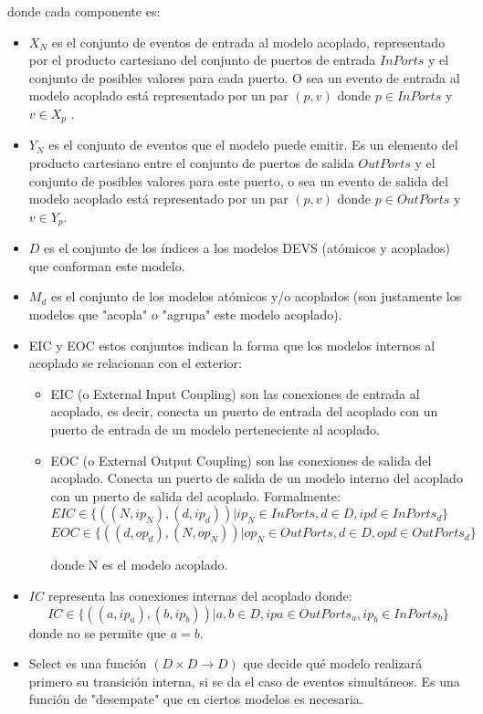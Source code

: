 \documentclass[a4paper,	11pt]{report}
\begin{document}
donde cada componente es:
\begin{itemize}
\item $X_N$ es el conjunto de eventos de entrada al modelo acoplado, representado por el producto cartesiano del conjunto de puertos de entrada $InPorts$ y el conjunto de posibles valores para cada puerto. O sea un evento de entrada al modelo acoplado está representado por un par $(p, v)$ donde $p \in InPorts$ y $v \in X_p$ .

\item $Y_N$ es el conjunto de eventos que el modelo puede emitir. Es un elemento del producto cartesiano entre el conjunto de puertos de salida $OutPorts$ y el conjunto de posibles valores para este puerto, o sea un evento de salida del modelo acoplado está representado por un par $(p, v)$ donde $p \in OutPorts$ y $v \in Y_p$.

\item $D$ es el conjunto de los índices a los modelos DEVS (atómicos y acoplados) que conforman este modelo. 

\item ${M_d }$ es el conjunto de los modelos atómicos y/o acoplados (son justamente los modelos que "acopla" o "agrupa" este modelo acoplado).

\item EIC y EOC estos conjuntos indican la forma que los modelos internos al acoplado se relacionan con el exterior:
      \begin {itemize}
          \item EIC (o External Input Coupling) son las conexiones de entrada al acoplado, es decir, conecta un puerto de entrada del acoplado con un puerto de entrada de un modelo perteneciente al acoplado.
          \item EOC (o External Output Coupling) son las conexiones de salida del acoplado. Conecta un puerto de salida de un modelo interno del acoplado con un puerto de salida del acoplado. Formalmente:
          $ EIC \in \{((N, ip_N ), (d, ip_d )) | ip_N \in InPorts, d \in D, ip d \in InPorts_d \} $
          $EOC \in \{((d, op_d ), (N, op_N ))  | op_N \in OutPorts, d \in D, op d \in OutPorts_d \} $
    
    	donde N es el modelo acoplado.
      \end{itemize}

\item $IC$ representa las conexiones internas del acoplado donde:
\begin{equation}
IC \in \{((a, ip_a ), (b, ip_b )) | a, b \in D, ip a \in OutPorts_a , ip_b \in InPorts_b \}
\end{equation}
donde no se permite que $a = b$.

\item Select es una función $(D \times D \to D)$ que decide qué modelo realizará primero su transición interna, si se da el caso de eventos simultáneos. Es una función de "desempate" que en ciertos modelos es necesaria.
\end{itemize}
\end{document}
